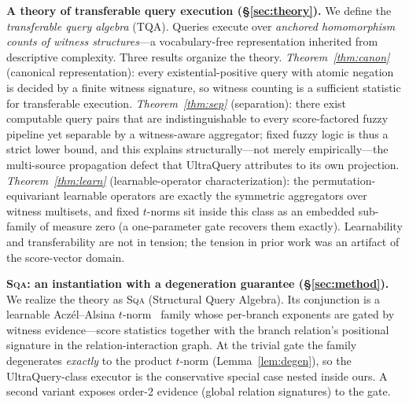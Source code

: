 \documentclass[journal]{IEEEtran}
\newcommand{\SQA}{\textsc{Sqa}}
\begin{document}
\textbf{
\textbf{A theory of transferable query execution} (\S\ref{sec:theory}).}
We define the \emph{transferable query algebra} (TQA). Queries execute over
\emph{anchored homomorphism counts of witness structures}---a
vocabulary-free representation inherited from descriptive complexity. Three
results organize the theory. \emph{Theorem~\ref{thm:canon}} (canonical
representation): every existential-positive query with atomic negation is
decided by a finite witness signature, so witness counting is a sufficient
statistic for transferable execution. \emph{Theorem~\ref{thm:sep}}
(separation): there exist computable query pairs that are indistinguishable
to every score-factored fuzzy pipeline yet separable by a witness-aware
aggregator; fixed fuzzy logic is thus a strict lower bound, and this explains
structurally---not merely empirically---the multi-source propagation defect
that UltraQuery attributes to its own projection.
\emph{Theorem~\ref{thm:learn}} (learnable-operator characterization): the
permutation-equivariant learnable operators are exactly the symmetric
aggregators over witness multisets, and fixed $t$-norms sit inside this
class as an embedded sub-family of measure zero (a one-parameter gate
recovers them exactly). Learnability and transferability are not in
tension; the tension in prior work was an artifact of the score-vector
domain.

\textbf{\SQA{}: an instantiation with a degeneration guarantee
(\S\ref{sec:method}).} We realize the theory as \SQA{} (Structural Query
Algebra). Its conjunction is a learnable Acz\'el--Alsina
$t$-norm~\cite{acersz,aczelsalsina,acersz2} family whose per-branch exponents are gated by
witness evidence---score statistics together with the branch relation's
positional signature in the relation-interaction graph. At the trivial gate
the family degenerates \emph{exactly} to the product $t$-norm
(Lemma~\ref{lem:degen}), so the UltraQuery-class executor is the
conservative special case nested inside ours. A second variant exposes
order-2 evidence (global relation signatures) to the gate.
\end{document}
